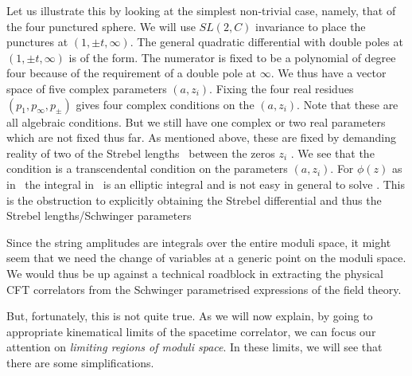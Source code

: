 Let us illustrate this by looking at the simplest non-trivial case,
namely, that of the four punctured sphere. We will use  
$SL(2,C)$ invariance to place the punctures at $(1,\pm t, \infty)$.
The general quadratic differential with double poles at $(1,\pm t, \infty)$
is of the form. 
\eqn{}
The numerator is fixed to be a polynomial of degree four because of the 
requirement of a double pole at $\infty$. 
We thus have a vector space of five complex parameters $(a,z_i)$. 
Fixing the four real residues 
$(p_1, p_{\infty}, p_{\pm})$ gives four complex conditions on the $(a,z_i)$.
Note that these are all algebraic conditions.
But we still have one complex or two real parameters which are not fixed
thus far. As mentioned above, these are fixed by demanding reality 
of two of the Strebel lengths \strl\ between the zeros $z_i$ 
.
We see that the condition
\eqn{}
is a transcendental condition on the parameters $(a,z_i)$. For  
$\phi(z)$ as in \qd\ the integral in \imstrl\ is an elliptic integral and
is not easy in general to solve 
. 
This is the obstruction to explicitly
obtaining the Strebel differential and thus the Strebel lengths/Schwinger
parameters
\eqn{}

Since the string amplitudes are integrals over the entire moduli space,
it might seem that we need the change of variables at a generic point
on the moduli space. We would thus be up against 
a technical roadblock in extracting the 
physical CFT correlators from the Schwinger parametrised expressions
of the field theory. 

But, fortunately, this is not quite true. 
As we will now explain, by going to 
appropriate kinematical limits of the spacetime correlator, we can 
focus our attention on {\it limiting regions of moduli space}.
In these limits, we will see that there are some simplifications.


